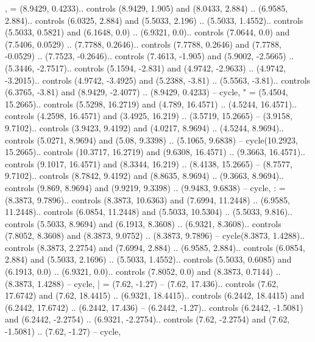 {,} = {(8.9429, 0.4233).. controls (8.9429, 1.905) and (8.0433, 2.884) .. (6.9585, 2.884).. controls (6.0325, 2.884) and (5.5033, 2.196) .. (5.5033, 1.4552).. controls (5.5033, 0.5821) and (6.1648, 0.0) .. (6.9321, 0.0).. controls (7.0644, 0.0) and (7.5406, 0.0529) .. (7.7788, 0.2646).. controls (7.7788, 0.2646) and (7.7788, -0.0529) .. (7.7523, -0.2646).. controls (7.4613, -1.905) and (5.9002, -2.5665) .. (5.3446, -2.7517).. controls (5.1594, -2.831) and (4.9742, -2.9633) .. (4.9742, -3.2015).. controls (4.9742, -3.4925) and (5.2388, -3.81) .. (5.5563, -3.81).. controls (6.3765, -3.81) and (8.9429, -2.4077) .. (8.9429, 0.4233) -- cycle},
{"} = {(5.4504, 15.2665).. controls (5.5298, 16.2719) and (4.789, 16.4571) .. (4.5244, 16.4571).. controls (4.2598, 16.4571) and (3.4925, 16.219) .. (3.5719, 15.2665) -- (3.9158, 9.7102).. controls (3.9423, 9.4192) and (4.0217, 8.9694) .. (4.5244, 8.9694).. controls (5.0271, 8.9694) and (5.08, 9.3398) .. (5.1065, 9.6838) -- cycle(10.2923, 15.2665).. controls (10.3717, 16.2719) and (9.6308, 16.4571) .. (9.3663, 16.4571).. controls (9.1017, 16.4571) and (8.3344, 16.219) .. (8.4138, 15.2665) -- (8.7577, 9.7102).. controls (8.7842, 9.4192) and (8.8635, 8.9694) .. (9.3663, 8.9694).. controls (9.869, 8.9694) and (9.9219, 9.3398) .. (9.9483, 9.6838) -- cycle},
{:} = {(8.3873, 9.7896).. controls (8.3873, 10.6363) and (7.6994, 11.2448) .. (6.9585, 11.2448).. controls (6.0854, 11.2448) and (5.5033, 10.5304) .. (5.5033, 9.816).. controls (5.5033, 8.9694) and (6.1913, 8.3608) .. (6.9321, 8.3608).. controls (7.8052, 8.3608) and (8.3873, 9.0752) .. (8.3873, 9.7896) -- cycle(8.3873, 1.4288).. controls (8.3873, 2.2754) and (7.6994, 2.884) .. (6.9585, 2.884).. controls (6.0854, 2.884) and (5.5033, 2.1696) .. (5.5033, 1.4552).. controls (5.5033, 0.6085) and (6.1913, 0.0) .. (6.9321, 0.0).. controls (7.8052, 0.0) and (8.3873, 0.7144) .. (8.3873, 1.4288) -- cycle},
{|} = {(7.62, -1.27) -- (7.62, 17.436).. controls (7.62, 17.6742) and (7.62, 18.4415) .. (6.9321, 18.4415).. controls (6.2442, 18.4415) and (6.2442, 17.6742) .. (6.2442, 17.436) -- (6.2442, -1.27).. controls (6.2442, -1.5081) and (6.2442, -2.2754) .. (6.9321, -2.2754).. controls (7.62, -2.2754) and (7.62, -1.5081) .. (7.62, -1.27) -- cycle},
